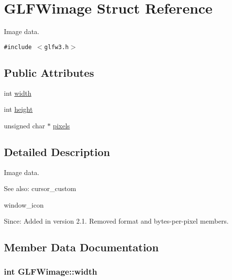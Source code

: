 \hypertarget{struct_g_l_f_wimage}{
\section{GLFWimage Struct Reference}
\label{struct_g_l_f_wimage}
}
Image data.  


{\tt \#include $<$glfw3.h$>$}

\subsection*{Public Attributes}
\begin{CompactItemize}
\item 
int \hyperlink{struct_g_l_f_wimage_f6a71cc999fe6d3aea31dd7e9687d835}{width}
\item 
int \hyperlink{struct_g_l_f_wimage_0b7d95368f0c80d5e5c9875057c7dbec}{height}
\item 
unsigned char $\ast$ \hyperlink{struct_g_l_f_wimage_0c532a5c2bb715555279b7817daba0fb}{pixels}
\end{CompactItemize}


\subsection{Detailed Description}
Image data. 

\begin{Desc}
\item[See also:]cursor\_\-custom 

window\_\-icon\end{Desc}
\begin{Desc}
\item[Since:]Added in version 2.1.  Removed format and bytes-per-pixel members. \end{Desc}


\subsection{Member Data Documentation}
\hypertarget{struct_g_l_f_wimage_f6a71cc999fe6d3aea31dd7e9687d835}{
\subsubsection[width]{\setlength{\rightskip}{0pt plus 5cm}int {\bf GLFWimage::width}}}
\label{struct_g_l_f_wimage_f6a71cc999fe6d3aea31dd7e9687d835}


